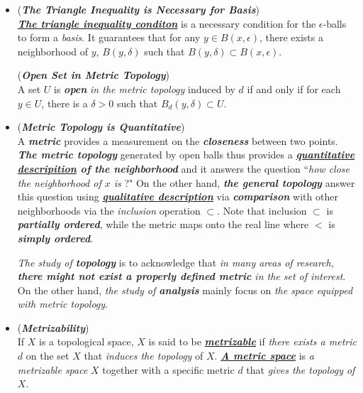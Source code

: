 \documentclass[11pt]{article}
\begin{document}
\begin{itemize}
\item \begin{remark} (\emph{\textbf{The Triangle Inequality is Necessary for Basis}})\\
\underline{\emph{\textbf{The triangle inequality conditon}}} is a necessary condition for the $\epsilon$-balls to form a \emph{basis}. It guarantees that for any $y \in B(x, \epsilon)$, there exists a neighborhood of $y$, $B(y, \delta)$ such that $B(y, \delta) \subset B(x, \epsilon)$.

\begin{definition} (\emph{\textbf{Open Set in Metric Topology}})\\
A set $U$ is \emph{\textbf{open}} \emph{in the metric topology} induced by $d$ if and only if for each $y \in U$, there is a $\delta > 0$ such that $B_d(y, \delta) \subset U$.
\end{definition}
\end{remark}

\item \begin{remark} (\emph{\textbf{Metric Topology is Quantitative}})\\
A \emph{\textbf{metric}}  provides a  measurement on the \emph{\textbf{closeness}} between two points. \emph{\textbf{The metric topology}} generated by open balls thus provides a \emph{\textbf{\underline{quantitative descripition} of the neighborhood}} and it answers the question ``\emph{how close the neighborhood of $x$ is} ?" On the other hand, \emph{\textbf{the general topology}} answer this question using \emph{\textbf{\underline{qualitative description}}} via \emph{\textbf{comparison}} with other neighborhoods via the \emph{inclusion} operation $\subset$. Note that inclusion $\subset$ is \emph{\textbf{partially ordered}}, while the metric maps onto the real line where $<$ is \emph{\textbf{simply ordered}}.

\emph{The study of \textbf{topology}} is to acknowledge that \emph{in many areas of research, \textbf{there might not exist a properly defined metric} in the set of interest}. On the other hand, \emph{the study of \textbf{analysis}} mainly focus on \emph{the space equipped with metric topology}.
\end{remark}

\item \begin{definition} (\textbf{\emph{Metrizability}})\\
If $X$ is a topological space, $X$ is said to be \underline{\emph{\textbf{metrizable}}} if \emph{there exists a metric} $d$ on the set $X$ that \emph{induces the topology} of $X$. \underline{\emph{\textbf{A metric space}}} is \emph{a metrizable space} $X$ together with a specific metric $d$ that \emph{gives the topology of $X$}.
\end{definition}


\end{itemize}
\end{document}
